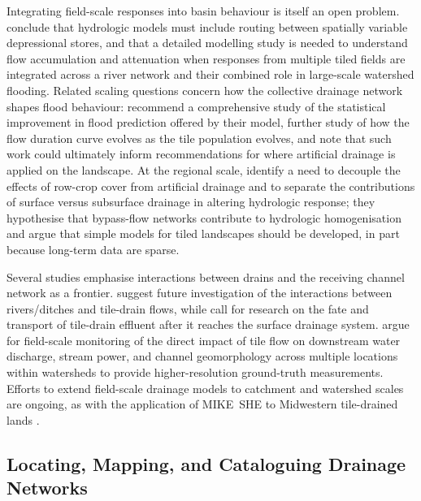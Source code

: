 Integrating field-scale responses into basin behaviour is itself an open problem. \textcite{Sloan2016} conclude that hydrologic models must include routing between spatially variable depressional stores, and that a detailed modelling study is needed to understand flow accumulation and attenuation when responses from multiple tiled fields are integrated across a river network and their combined role in large-scale watershed flooding. Related scaling questions concern how the collective drainage network shapes flood behaviour: \textcite{Fonley2021} recommend a comprehensive study of the statistical improvement in flood prediction offered by their model, further study of how the flow duration curve evolves as the tile population evolves, and note that such work could ultimately inform recommendations for where artificial drainage is applied on the landscape. At the regional scale, \textcite{BolandBrien2014} identify a need to decouple the effects of row-crop cover from artificial drainage and to separate the contributions of surface versus subsurface drainage in altering hydrologic response; they hypothesise that bypass-flow networks contribute to hydrologic homogenisation and argue that simple models for tiled landscapes should be developed, in part because long-term data are sparse.

Several studies emphasise interactions between drains and the receiving channel network as a frontier. \textcite{Grangeon2021} suggest future investigation of the interactions between rivers/ditches and tile-drain flows, while \textcite{Clement2017} call for research on the fate and transport of tile-drain effluent after it reaches the surface drainage system. \textcite{Zhou2025} argue for field-scale monitoring of the direct impact of tile flow on downstream water discharge, stream power, and channel geomorphology across multiple locations within watersheds to provide higher-resolution ground-truth measurements. Efforts to extend field-scale drainage models to catchment and watershed scales are ongoing, as with the application of MIKE~SHE to Midwestern tile-drained lands \parencite{Zhou2013}.

\subsection{Locating, Mapping, and Cataloguing Drainage Networks}

